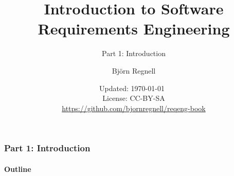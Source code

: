 \documentclass{reqenglecture}
\title{Introduction to Software Requirements Engineering}
\subtitle{Part 1: Introduction}
\author{Björn Regnell}
\date{\vspace{1em}\footnotesize Updated: \today~
\\ License: CC-BY-SA 
\\ \url{https://github.com/bjornregnell/reqeng-book} 
}
\begin{document}
\maketitle

\begin{frame}
\frametitle{Part 1: Introduction}
\framesubtitle{Outline}
\tableofcontents
\end{frame}


















\end{document}
